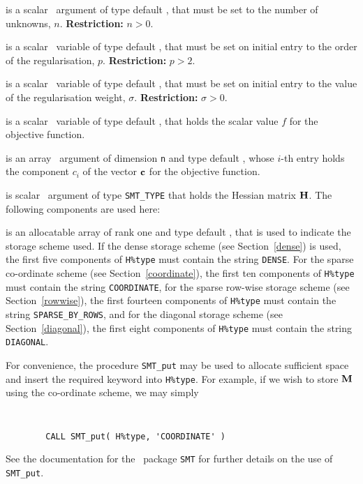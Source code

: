 \documentclass{galahad}
\begin{document}
\begin{description}

 is a scalar \intentin\ argument of type default \integer, that must be
set to the number of unknowns, $n$. {\bf Restriction: } $n  >  0$.

 is a scalar \intentin\ variable of type default \realdp,
that must be set on initial entry
to the order of the regularisation, $p$.
{\bf Restriction: } $p > 2$.

 is a scalar \intentin\ variable of type default \realdp,
that must be set on initial entry
to the value of the regularisation weight, $\sigma$.
{\bf Restriction: } $\sigma > 0$.

 is a scalar \intentin\ variable of type default \realdp, that holds
the scalar value $f$ for the objective function.

 is an array \intentin\ argument of dimension {\tt n} and
type default \realdp,  whose $i$-th entry holds the component $c_i$ of
the vector ${\mathbf{c}}$ for the objective function.

 is scalar \intentin\ argument of type {\tt SMT\_TYPE}
that holds the Hessian matrix ${\mathbf{H}}$. The following components
are used here:

\begin{description}

 is an allocatable array of rank one and type default
\character, that
is used to indicate the storage scheme used. If the dense storage scheme
(see Section~\ref{dense}) is used,
the first five components of {\tt H\%type} must contain the
string {\tt DENSE}.
For the sparse co-ordinate scheme (see Section~\ref{coordinate}),
the first ten components of {\tt H\%type} must contain the
string {\tt COORDINATE},
for the sparse row-wise storage scheme (see Section~\ref{rowwise}),
the first fourteen components of {\tt H\%type} must contain the
string {\tt SPARSE\_BY\_ROWS},
and for the diagonal storage scheme (see Section~\ref{diagonal}),
the first eight components of {\tt H\%type} must contain the
string {\tt DIAGONAL}.

For convenience, the procedure {\tt SMT\_put}
may be used to allocate sufficient space and insert the required keyword
into {\tt H\%type}.
For example, if we wish to store ${\mathbf{M}}$ using the co-ordinate scheme,
we may simply
{\tt
\begin{verbatim}
        CALL SMT_put( H%type, 'COORDINATE' )
\end{verbatim}
}
\noindent
See the documentation for the \galahad\ package {\tt SMT}
for further details on the use of {\tt SMT\_put}.


\end{description}
\end{description}
\end{document}
